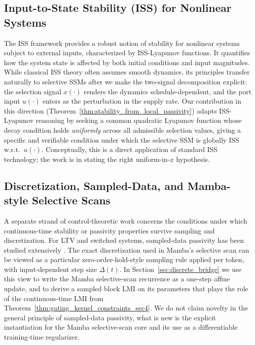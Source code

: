 \documentclass[10pt]{article} %
\theoremstyle{definition}
\begin{document}
\subsection{Input-to-State Stability (ISS) for Nonlinear Systems}
The ISS framework \citep{Sontag1989SmoothSF, Sontag1995OnCO, Jiang1999InputtostateSF} provides a robust notion of stability for nonlinear systems subject to external inputs, characterized by ISS-Lyapunov functions. It quantifies how the system state is affected by both initial conditions and input magnitudes. While classical ISS theory often assumes smooth dynamics, its principles transfer naturally to selective SSMs after we make the two-signal decomposition explicit: the selection signal $x(\cdot)$ renders the dynamics schedule-dependent, and the port input $u(\cdot)$ enters as the perturbation in the supply rate. Our contribution in this direction (Theorem~\ref{thm:stability_from_local_passivity}) adapts ISS-Lyapunov reasoning by seeking a common quadratic Lyapunov function whose decay condition holds \emph{uniformly} across all admissible selection values, giving a specific and verifiable condition under which the selective SSM is globally ISS w.r.t.\ $u(\cdot)$. Conceptually, this is a direct application of standard ISS technology; the work is in stating the right uniform-in-$x$ hypothesis.

\subsection{Discretization, Sampled-Data, and Mamba-style Selective Scans}
A separate strand of control-theoretic work concerns the conditions under which continuous-time stability or passivity properties survive sampling and discretization. For LTV and switched systems, sampled-data passivity has been studied extensively \citep{liberzon2003switching, anderson2013network}. The exact discretization used in Mamba's selective scan \citep{gu2024mamba} can be viewed as a particular zero-order-hold-style sampling rule applied per token, with input-dependent step size $\Delta(t)$. In Section~\ref{sec:discrete_bridge} we use this view to write the Mamba selective-scan recurrence as a one-step affine update, and to derive a sampled block LMI on its parameters that plays the role of the continuous-time LMI from Theorem~\ref{thm:gating_kernel_constraints_sec4}. We do not claim novelty in the general principle of sampled-data passivity, what is new is the explicit instantiation for the Mamba selective-scan core and its use as a differentiable training-time regularizer.
\end{document}
